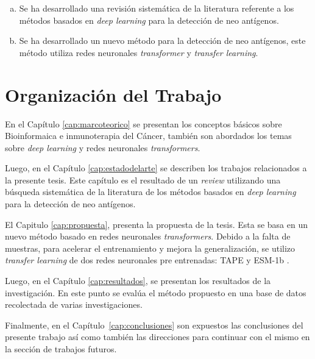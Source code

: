 \begin{enumerate}[(a)]
	\item Se ha desarrollado una revisión sistemática de la literatura referente a los métodos basados en \textit{deep learning} para la detección de neo antígenos.
	\item Se ha desarrollado un nuevo método para la detección de neo antígenos, este método utiliza redes neuronales \textit{transformer} y \textit{transfer learning}.
\end{enumerate}

\section{Organización del Trabajo}
\label{sec:organizaciondeltrabajo}
En el Capítulo \ref{cap:marcoteorico} se presentan los conceptos básicos sobre Bioinformaica e inmunoterapia del Cáncer, también son abordados los temas sobre \textit{deep learning} y redes neuronales \textit{transformers}.

Luego, en el Capítulo \ref{cap:estadodelarte} se describen los trabajos relacionados a la presente tesis. Este capítulo es el resultado de un \textit{review} utilizando una búsqueda sistemática de la literatura de los métodos basados en \textit{deep learning} para la detección de neo antígenos.

El Capitulo \ref{cap:propuesta}, presenta la propuesta de la tesis. Esta se basa en un nuevo método basado en redes neuronales \textit{transformers}. Debido a la falta de muestras, para acelerar el entrenamiento y mejora la generalización, se utilizo \textit{transfer learning} de dos redes neuronales pre entrenadas: TAPE \citep{rao2019evaluating} y ESM-1b \citep{rives2021biological}.

Luego, en el Capítulo  \ref{cap:resultados}, se presentan los resultados de la investigación. En este punto se evalúa el método propuesto en una base de datos recolectada de varias investigaciones.

Finalmente, en el Capítulo~\ref{cap:conclusiones} son expuestos las conclusiones del presente trabajo así como también las direcciones para continuar con el mismo en la sección de trabajos futuros.






